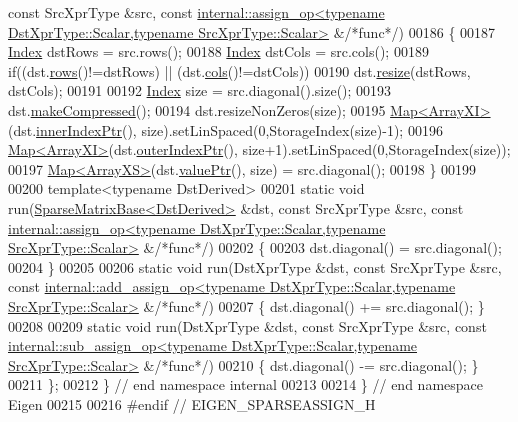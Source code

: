 \begin{DoxyCode}
{      const} SrcXprType &src, \textcolor{keyword}{const} 
      \hyperlink{struct_eigen_1_1internal_1_1assign__op}{internal::assign\_op<typename DstXprType::Scalar,typename SrcXprType::Scalar>}
       &\textcolor{comment}{/*func*/})
00186   \{
00187     \hyperlink{namespace_eigen_a62e77e0933482dafde8fe197d9a2cfde}{Index} dstRows = src.rows();
00188     \hyperlink{namespace_eigen_a62e77e0933482dafde8fe197d9a2cfde}{Index} dstCols = src.cols();
00189     \textcolor{keywordflow}{if}((dst.\hyperlink{group___sparse_core___module_a62e61bb861eee306d5b069ce652b5aa5}{rows}()!=dstRows) || (dst.\hyperlink{group___sparse_core___module_aa391750e3c530227e4a5c3c52e959975}{cols}()!=dstCols))
00190       dst.\hyperlink{group___sparse_core___module_af88551f30202341b7cc24cfadabdec5c}{resize}(dstRows, dstCols);
00191 
00192     \hyperlink{namespace_eigen_a62e77e0933482dafde8fe197d9a2cfde}{Index} size = src.diagonal().size();
00193     dst.\hyperlink{group___sparse_core___module_a5ff54ffc10296f9466dc81fa888733fd}{makeCompressed}();
00194     dst.resizeNonZeros(size);
00195     \hyperlink{group___core___module_class_eigen_1_1_map}{Map<ArrayXI>}(dst.\hyperlink{group___sparse_core___module_ae7b804bd39745156d20ca1611a296b67}{innerIndexPtr}(), size).setLinSpaced(0,StorageIndex(size)-1);
00196     \hyperlink{group___core___module_class_eigen_1_1_map}{Map<ArrayXI>}(dst.\hyperlink{group___sparse_core___module_a75506964d86d6badb32d0b4917acf2e2}{outerIndexPtr}(), size+1).setLinSpaced(0,StorageIndex(size));
00197     \hyperlink{group___core___module_class_eigen_1_1_map}{Map<ArrayXS>}(dst.\hyperlink{group___sparse_core___module_a9d4354d3f4d121d764bbed33cac05329}{valuePtr}(), size) = src.diagonal();
00198   \}
00199   
00200   \textcolor{keyword}{template}<\textcolor{keyword}{typename} DstDerived>
00201   \textcolor{keyword}{static} \textcolor{keywordtype}{void} run(\hyperlink{group___sparse_core___module_class_eigen_1_1_sparse_matrix_base}{SparseMatrixBase<DstDerived>} &dst, \textcolor{keyword}{const} SrcXprType &src, \textcolor{keyword}{
      const} \hyperlink{struct_eigen_1_1internal_1_1assign__op}{internal::assign\_op<typename DstXprType::Scalar,typename SrcXprType::Scalar>}
       &\textcolor{comment}{/*func*/})
00202   \{
00203     dst.diagonal() = src.diagonal();
00204   \}
00205   
00206   \textcolor{keyword}{static} \textcolor{keywordtype}{void} run(DstXprType &dst, \textcolor{keyword}{const} SrcXprType &src, \textcolor{keyword}{const} 
      \hyperlink{struct_eigen_1_1internal_1_1add__assign__op}{internal::add\_assign\_op<typename DstXprType::Scalar,typename SrcXprType::Scalar>}
       &\textcolor{comment}{/*func*/})
00207   \{ dst.diagonal() += src.diagonal(); \}
00208   
00209   \textcolor{keyword}{static} \textcolor{keywordtype}{void} run(DstXprType &dst, \textcolor{keyword}{const} SrcXprType &src, \textcolor{keyword}{const} 
      \hyperlink{struct_eigen_1_1internal_1_1sub__assign__op}{internal::sub\_assign\_op<typename DstXprType::Scalar,typename SrcXprType::Scalar>}
       &\textcolor{comment}{/*func*/})
00210   \{ dst.diagonal() -= src.diagonal(); \}
00211 \};
00212 \} \textcolor{comment}{// end namespace internal}
00213 
00214 \} \textcolor{comment}{// end namespace Eigen}
00215 
00216 \textcolor{preprocessor}{#endif // EIGEN\_SPARSEASSIGN\_H}
\end{DoxyCode}
